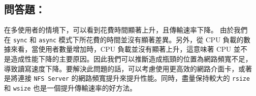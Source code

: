 \documentclass[12pt]{article}
\begin{document}
\subsection*{問答題：}
在多使用者的情境下，可以看到花費時間顯著上升，且傳輸速率下降。 由於我們在 \texttt{sync} 和 \texttt{async} 模式下所花費的時間並沒有顯著差異。另外，從 CPU 負載的數據來看，當使用者數量增加時，CPU 負載並沒有顯著上升，這意味著 CPU 並不是造成性能下降的主要原因。因此我們可以推斷造成瓶頸的位置為網路頻寬不足，導致讀寫速度下降。要解決此問題的話，可以考慮使用更高效的網路介面卡，或著是將連接 \texttt{NFS Server} 的網路頻寬提升來提升性能。同時，盡量保持較大的 \texttt{rsize} 和 \texttt{wsize} 也是一個提升傳輸速率的好方法。
\end{document}

